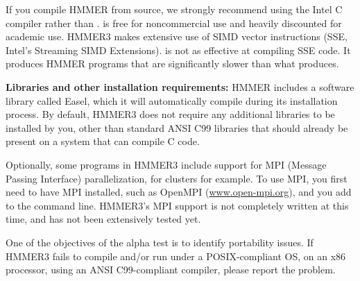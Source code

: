 If you compile HMMER from source, we strongly recommend using the
Intel C compiler  rather than .  is free
for noncommercial use and heavily discounted for academic use.  HMMER3
makes extensive use of SIMD vector instructions (SSE, Intel's
Streaming SIMD Extensions).  is not as effective at
compiling SSE code. It produces HMMER programs that are significantly
slower than what  produces.

\textbf{Libraries and other installation requirements:} HMMER includes
a software library called Easel, which it will automatically compile
during its installation process.  By default, HMMER3 does not require
any additional libraries to be installed by you, other than standard
ANSI C99 libraries that should already be present on a system that can
compile C code.

Optionally, some programs in HMMER3 include support for MPI (Message
Passing Interface) parallelization, for clusters for example. To use
MPI, you first need to have MPI installed, such as OpenMPI
(\url{www.open-mpi.org}), and you add  to the
 command line. HMMER3's MPI support is not
completely written at this time, and has not been extensively tested
yet.


\begin{sidebar}
One of the objectives of the alpha test is to identify portability
issues. If HMMER3 fails to compile and/or run under a POSIX-compliant
OS, on an x86 processor, using an ANSI C99-compliant compiler, please
report the problem.
\end{sidebar}











